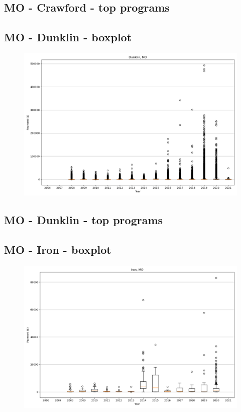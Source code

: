 \subsection*{MO - Crawford - top programs}

\newpage
\subsection*{MO - Dunklin - boxplot}
\begin{figure}[h]
\centering
\includegraphics[width=7in]{../output/boxplots/counties/Dunklin-MO_boxplot.png}
\end{figure}


\subsection*{MO - Dunklin - top programs}

\newpage
\subsection*{MO - Iron - boxplot}
\begin{figure}[h]
\centering
\includegraphics[width=7in]{../output/boxplots/counties/Iron-MO_boxplot.png}
\end{figure}


